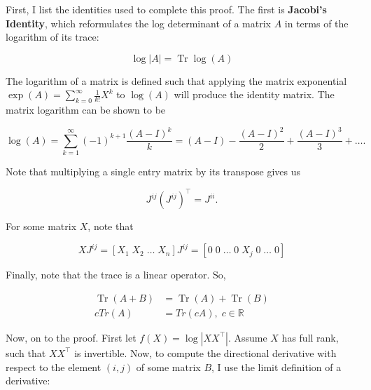\documentclass[12pt]{article}
\theoremstyle{definition}
\DeclareMathOperator{\Tr}{Tr}
\begin{document}
First, I list the identities used to complete this proof. The first is \textbf{Jacobi's Identity}, which reformulates the log determinant of a matrix $A$ in terms of the logarithm of its trace:

\begin{equation}
    \label{eqn:Jacobi}
    \log |A| = \Tr \log (A)
\end{equation}

The logarithm of a matrix is defined such that applying the matrix exponential $\exp(A) = \sum_{k=0}^{\infty} \frac{1}{k!} X^k$ to $\log(A)$ will produce the identity matrix. The matrix logarithm can be shown to be

\begin{equation}
    \label{eqn:matrixLog}
    \log(A) = \sum_{k=1}^{\infty} (-1)^{k+1} \frac{(A-I)^k}{k} = (A - I) - \frac{(A-I)^2}{2} + \frac{(A-I)^3}{3} + \dots.
\end{equation}

Note that multiplying a single entry matrix by its transpose gives us

\[
J^{ij} (J^{ij})^\top = J^{ii}.
\]

For some matrix $X$, note that

\[
XJ^{ij} = [X_1 \; X_2 \; \dots \; X_n] J^{ij} = [0 \; 0 \;  \dots \; 0 \; X_j \; 0 \; \dots \;  0]
\]

Finally, note that the trace is a linear operator. So,

\[
\begin{split}
    \Tr(A + B) & = \Tr(A) + \Tr(B) \\ 
    cTr(A) &= Tr(cA), \; c \in \mathbb{R}
\end{split}
\]

Now, on to the proof. First let $f(X) = \log |XX^\top|$. Assume $X$ has full rank, such that $XX^\top$ is invertible. Now, to compute the directional derivative with respect to the element $(i,j)$ of some matrix $B$, I use the limit definition of a derivative:
\end{document}
